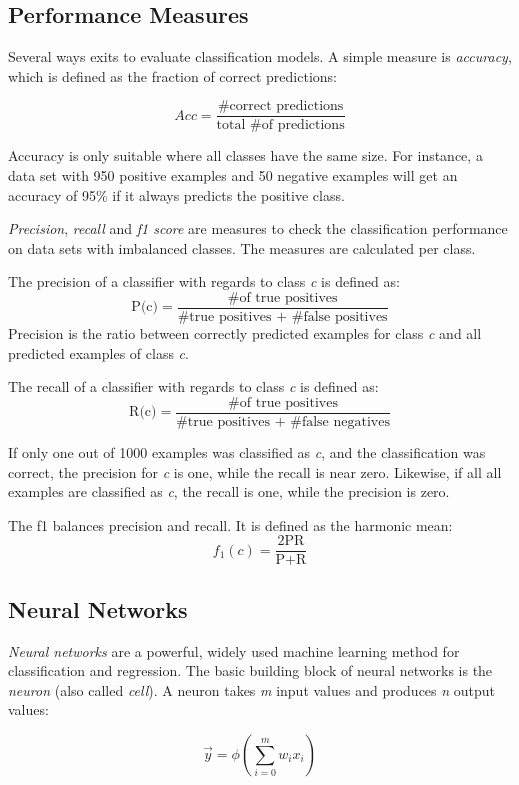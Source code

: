 \subsection{Performance Measures}
Several ways exits to evaluate classification models. A simple measure is \emph{accuracy}, which is defined as the fraction of correct predictions:

\[ Acc = \frac{\text{\# correct predictions}}{\text{total \# of predictions}} \]

Accuracy is only suitable where all classes have the same size. For instance, a data set with 950 positive examples and 50 negative examples will get an accuracy of 95\% if it always predicts the positive class.


\emph{Precision}, \emph{recall} and \emph{f1 score} are measures to check the classification performance on data sets with imbalanced classes. The measures are calculated per class.

The precision of a classifier with regards to class \emph{c} is defined as:
\[ \text{P(c)} = \frac{\text{\# of true positives}}{\text{\# true positives + \# false positives}} \]
Precision is the ratio between correctly predicted examples for class \emph{c} and all predicted examples of class \emph{c}.


The recall of a classifier with regards to class \emph{c} is defined as:
\[ \text{R(c)} = \frac{\text{\# of true positives}}{\text{\# true positives + \# false negatives}} \]


If only one out of 1000 examples was classified as \emph{c}, and the classification was correct, the precision for \emph{c} is one, while the recall is near zero. Likewise, if all  all examples are classified as \emph{c}, the recall is one, while the precision is zero. 

The f1 balances precision and recall. It is defined as the harmonic mean:
\[ f_{1}(c) = \frac{\text{2PR}}{\text{P+R}} \]


\subsection{Neural Networks}
\emph{Neural networks} are a powerful, widely used machine learning method for classification and regression. The basic building block of neural networks is the \emph{neuron} (also called \emph{cell}). A neuron takes \emph{m} input values and produces \emph{n} output values:

\[ \vec{y} = \phi \left( \sum^m_{i=0} w_ix_i \right) \]

